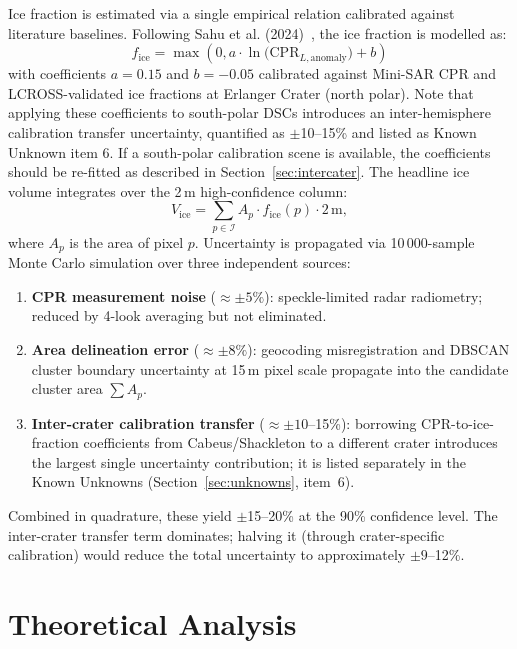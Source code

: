 \documentclass[10pt,conference]{IEEEtran}
\newcommand{\CPR}{\mathrm{CPR}}
\newcommand{\Fice}{f_{\mathrm{ice}}}
\newcommand{\Vice}{V_{\mathrm{ice}}}
\begin{document}
Ice fraction is estimated via a single empirical relation calibrated against literature baselines. Following Sahu et al. (2024)~\cite{sahu2024integrated}, the ice fraction is modelled as:
\begin{equation}
\Fice = \max\left(0, a \cdot \ln\!\bigl(\CPR_{L,\mathrm{anomaly}}\bigr) + b\right)
\label{eq:icefrac}
\end{equation}
with coefficients $a = 0.15$ and $b = -0.05$ calibrated against Mini-SAR CPR and LCROSS-validated ice fractions at Erlanger Crater (north polar). Note that applying these coefficients to south-polar DSCs introduces an inter-hemisphere calibration transfer uncertainty, quantified as $\pm$10--15\% and listed as Known Unknown item 6. If a south-polar calibration scene is available, the coefficients should be re-fitted as described in Section~\ref{sec:intercater}.
The headline ice volume integrates over the 2\,m high-confidence column:
\begin{equation}
\Vice = \sum_{p \in \mathcal{I}} A_p \cdot \Fice(p) \cdot 2\,\text{m},
\label{eq:vice}
\end{equation}
where $A_p$ is the area of pixel $p$.
Uncertainty is propagated via 10\,000-sample Monte Carlo simulation
over three independent sources:
\begin{enumerate}
  \item \textbf{CPR measurement noise} ($\approx\pm5\%$): speckle-limited
    radar radiometry; reduced by 4-look averaging but not eliminated.
  \item \textbf{Area delineation error} ($\approx\pm8\%$): geocoding
    misregistration and DBSCAN cluster boundary uncertainty at 15\,m pixel
    scale propagate into the candidate cluster area $\sum A_p$.
  \item \textbf{Inter-crater calibration transfer} ($\approx\pm10$--15\%):
    borrowing CPR-to-ice-fraction coefficients from Cabeus/Shackleton
    to a different crater introduces the largest single uncertainty
    contribution; it is listed separately in the Known Unknowns
    (Section~\ref{sec:unknowns}, item~6).
\end{enumerate}
Combined in quadrature, these yield $\pm$15--20\% at the 90\%
confidence level.
The inter-crater transfer term dominates; halving it (through
crater-specific calibration) would reduce the total uncertainty to
approximately $\pm9$--12\%.


\section{Theoretical Analysis}
\label{sec:theory}
\end{document}
